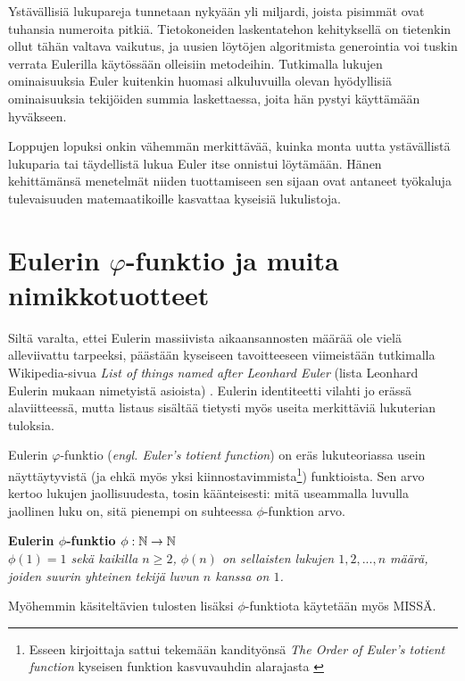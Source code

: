 \documentclass[a4paper,11pt]{article}
\begin{document}
Ystävällisiä lukupareja tunnetaan nykyään yli miljardi, joista pisimmät ovat tuhansia numeroita pitkiä. Tietokoneiden laskentatehon kehityksellä on tietenkin ollut tähän valtava vaikutus, ja uusien löytöjen algoritmista generointia voi tuskin verrata Eulerilla käytössään olleisiin metodeihin. Tutkimalla lukujen ominaisuuksia Euler kuitenkin huomasi alkuluvuilla olevan hyödyllisiä ominaisuuksia tekijöiden summia laskettaessa, joita hän pystyi käyttämään hyväkseen. \cite{tarvii kaivaa siitä yhdestä exam paperista}

Loppujen lopuksi onkin vähemmän merkittävää, kuinka monta uutta ystävällistä lukuparia tai täydellistä lukua Euler itse onnistui löytämään. Hänen kehittämänsä menetelmät niiden tuottamiseen sen sijaan ovat antaneet työkaluja tulevaisuuden matemaatikoille kasvattaa kyseisiä lukulistoja.

\section{Eulerin $\varphi$-funktio ja muita nimikkotuotteet}

Siltä varalta, ettei Eulerin massiivista aikaansannosten määrää ole vielä alleviivattu tarpeeksi, päästään kyseiseen tavoitteeseen viimeistään tutkimalla Wikipedia-sivua \textit{List of things named after Leonhard Euler} (lista Leonhard Eulerin mukaan nimetyistä asioista) \cite{listofthings}. Eulerin identiteetti vilahti jo erässä alaviitteessä, mutta listaus sisältää tietysti myös useita merkittäviä lukuterian tuloksia.

Eulerin $\varphi$-funktio (\textit{engl. Euler's totient function}) on eräs lukuteoriassa usein näyttäytyvistä (ja ehkä myös yksi kiinnostavimmista\footnote{Esseen kirjoittaja sattui tekemään kandityönsä \textit{The Order of Euler's totient function} kyseisen funktion kasvuvauhdin alarajasta \cite{kandi}}) funktioista. Sen arvo kertoo lukujen jaollisuudesta, tosin käänteisesti: mitä useammalla luvulla jaollinen luku on, sitä pienempi on suhteessa $\phi$-funktion arvo.

\begin{center}
    \textbf{Eulerin $\phi$-funktio $\phi: \mathbb{N} \rightarrow \mathbb{N}$}\\
    \textit{$\phi(1)=1$ sekä kaikilla $n\geq2$, $\phi(n)$ on sellaisten lukujen $1,2,...,n$ määrä, joiden suurin yhteinen tekijä luvun $n$ kanssa on $1$.}
\end{center}

Myöhemmin käsiteltävien tulosten lisäksi $\phi$-funktiota käytetään myös MISSÄ.
\end{document}
